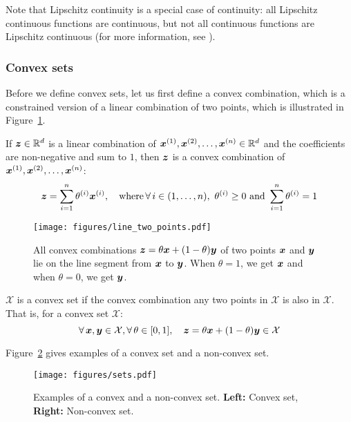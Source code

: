 \documentclass{article}
\newcommand{\R}{\mathbb{R}}
\newcommand{\X}{\mathcal{X}}
\begin{document}
Note that Lipschitz continuity is a special case of continuity: all Lipschitz continuous functions are continuous, but not all continuous functions are Lipschitz continuous (for more information, see \cite{boyd2004convex}).



\subsubsection{Convex sets}
\label{subsubsec:convexAnalysis:background:convexSets}
Before we define convex sets, let us first define a convex combination, which is a constrained version of a linear combination of two points, which is illustrated in Figure~\ref{fig:two_points}.

\begin{defn}
If $\vz \in \R^d$ is a linear combination of $\vx^{(1)}, \vx^{(2)},\ldots,\vx^{(n)} \in \R^d$ and the coefficients are non-negative and sum to $1$, then ${\bm{z}}$ is a convex combination of ${\bm{x}}^{(1)}, {\bm{x}}^{(2)},\ldots,{\bm{x}}^{(n)}$:
\[
    \vz = \sum_{i=1}^n\theta^{(i)} \vx^{(i)}, \quad\text{where} \forall i \in (1,\ldots,n),\ \theta^{(i)} \geq 0 \text{ and } \sum_{i=1}^n \theta^{(i)} = 1
\]
\end{defn}

\begin{figure}[ht]
\centering
    \texttt{[image: figures/line\_two\_points.pdf]}
    \caption{All convex combinations ${\bm{z}} = \theta {\bm{x}} + (1-\theta){\bm{y}}$ of two points ${\bm{x}}$ and ${\bm{y}}$ lie on the line segment from ${\bm{x}}$ to ${\bm{y}}$. When $\theta=1$, we get ${\bm{x}}$ and when $\theta=0$, we get ${\bm{y}}$.}
    \label{fig:two_points}
\end{figure}


\begin{defn}
$\X$ is a convex set if the convex combination any two points in $\X$ is also in $\X$. That is, for a convex set $\X$:
\[
\forall \vx,\vy \in \X, \forall \theta \in  [0, 1],\quad \vz = \theta \vx + (1-\theta)\vy \in \X
\]
\end{defn}

Figure~\ref{fig:sets} gives examples of a convex set and a non-convex set.

\begin{figure}[ht]
\centering
    \texttt{[image: figures/sets.pdf]}%
    \caption{Examples of a convex and a non-convex set. \textbf{Left:} Convex set, \textbf{Right:} Non-convex set.}
    \label{fig:sets}
\end{figure}
\end{document}
